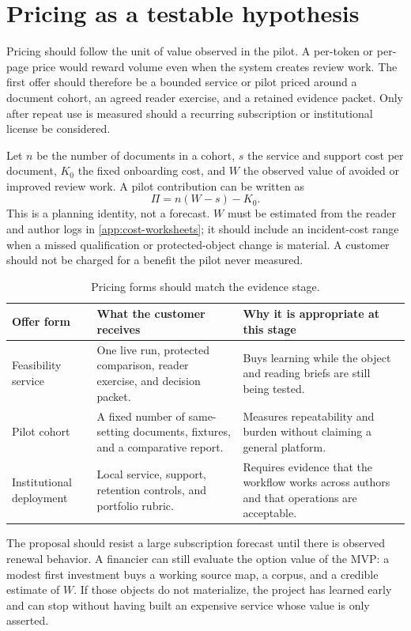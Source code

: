 \section{Pricing as a testable hypothesis}
\label{sec:adoption-pricing}

Pricing should follow the unit of value observed in the pilot. A per-token or
per-page price would reward volume even when the system creates review work.
The first offer should therefore be a bounded service or pilot priced around a
document cohort, an agreed reader exercise, and a retained evidence packet.
Only after repeat use is measured should a recurring subscription or
institutional license be considered.

Let $n$ be the number of documents in a cohort, $s$ the service and support
cost per document, $K_0$ the fixed onboarding cost, and $W$ the observed value
of avoided or improved review work. A pilot contribution can be written as
\[
  \Pi = n(W-s)-K_0.
\]
This is a planning identity, not a forecast. $W$ must be estimated from the
reader and author logs in \autoref{app:cost-worksheets}; it should include an
incident-cost range when a missed qualification or protected-object change is
material. A customer should not be charged for a benefit the pilot never
measured.

\begin{table}[H]
\centering
\small
\begin{tabularx}{\textwidth}{@{}p{}p{}L@{}}
\toprule
Offer form & What the customer receives & Why it is appropriate at this stage \\
\midrule
Feasibility service & One live run, protected comparison, reader exercise,
and decision packet. & Buys learning while the object and reading briefs are
still being tested. \\
Pilot cohort & A fixed number of same-setting documents, fixtures, and a
comparative report. & Measures repeatability and burden without claiming a
general platform. \\
Institutional deployment & Local service, support, retention controls, and
portfolio rubric. & Requires evidence that the workflow works across authors
and that operations are acceptable. \\
\bottomrule
\end{tabularx}
\caption{Pricing forms should match the evidence stage.}
\label{tab:pricing-forms}
\end{table}

The proposal should resist a large subscription forecast until there is
observed renewal behavior. A financier can still evaluate the option value of
the MVP: a modest first investment buys a working source map, a corpus, and a
credible estimate of $W$. If those objects do not materialize, the project
has learned early and can stop without having built an expensive service
whose value is only asserted.

